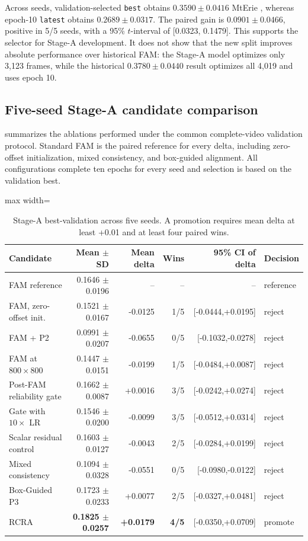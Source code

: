 Across seeds, validation-selected \texttt{best} obtains
\(0.3590\pm0.0416\) MtErie \mapfifty{}, whereas epoch-10 \texttt{latest}
obtains \(0.2689\pm0.0317\). The paired gain is
\(0.0901\pm0.0466\), positive in 5/5 seeds, with a 95\% \(t\)-interval of
[0.0323, 0.1479]. This supports the selector for Stage-A development. It does
not show that the new split improves absolute performance over historical FAM:
the Stage-A model optimizes only 3,123 frames, while the historical
\(0.3780\pm0.0440\) result optimizes all 4,019 and uses epoch 10.

\subsection{Five-seed Stage-A candidate comparison}

 summarizes the ablations performed under the
common complete-video validation protocol. Standard FAM is the paired reference
for every delta, including zero-offset initialization, mixed consistency, and
box-guided alignment.
All configurations complete ten epochs for every seed and selection is based on
the validation best.

\begin{table}[htbp]
  \centering
  \caption{Stage-A best-validation \mapfifty{} across five seeds. A promotion
  requires mean delta at least +0.01 and at least four paired wins.}
  \label{tab:stage-a-candidates}
  \begin{adjustbox}{max width=\textwidth}
  \begin{tabular}{lrrrrl}
    \toprule
    Candidate & Mean \(\pm\) SD & Mean delta & Wins & 95\% CI of delta & Decision \\
    \midrule
    FAM reference & 0.1646 \(\pm\) 0.0196 & -- & -- & -- & reference \\
    FAM, zero-offset init. & 0.1521 \(\pm\) 0.0167 & -0.0125 & 1/5 & [-0.0444,+0.0195] & reject \\
    FAM + P2 & 0.0991 \(\pm\) 0.0207 & -0.0655 & 0/5 & [-0.1032,-0.0278] & reject \\
    FAM at \(800\times800\) & 0.1447 \(\pm\) 0.0151 & -0.0199 & 1/5 & [-0.0484,+0.0087] & reject \\
    Post-FAM reliability gate & 0.1662 \(\pm\) 0.0087 & +0.0016 & 3/5 & [-0.0242,+0.0274] & reject \\
    Gate with \(10\times\) LR & 0.1546 \(\pm\) 0.0200 & -0.0099 & 3/5 & [-0.0512,+0.0314] & reject \\
    Scalar residual control & 0.1603 \(\pm\) 0.0127 & -0.0043 & 2/5 & [-0.0284,+0.0199] & reject \\
    Mixed consistency & 0.1094 \(\pm\) 0.0328 & -0.0551 & 0/5 & [-0.0980,-0.0122] & reject \\
    Box-Guided P3 & 0.1723 \(\pm\) 0.0233 & +0.0077 & 2/5 & [-0.0327,+0.0481] & reject \\
    RCRA & \textbf{0.1825 \(\pm\) 0.0257} & \textbf{+0.0179} & \textbf{4/5} & [-0.0350,+0.0709] & promote \\
    \bottomrule
  \end{tabular}
  \end{adjustbox}
\end{table}

